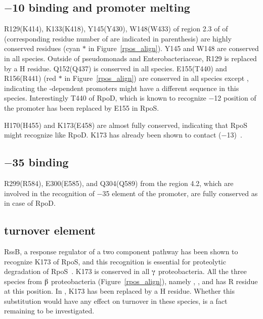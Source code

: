 \subsection{$-$10 binding and promoter melting}

R129(K414), K133(K418), Y145(Y430), W148(W433) of region 2.3 of of
\sigs{} (corresponding residue number of \siga{} are indicated in
parenthesis) are highly con\-served residues (cyan $\ast$ in
Figure~\ref{rpos_align}). Y145 and W148 are conserved in all
species. Outside of pseudomonads and Enterobacteriaceae, R129 is
replaced by a H residue. Q152(Q437) is conserved in all species.
E155(T440) and R156(R441) (red $\ast$ in Figure~\ref{rpos_align})
are conserved in all species except , indicating the
-dependent promoters might have a different sequence in
this species. Interestingly T440 of RpoD, which is known to
recognize $-$12 position of the promoter has been replaced by E155
in RpoS.

H170(H455) and K173(E458) are almost fully conserved, indicating
that RpoS might recognize  like RpoD. K173 has
already been shown to contact ($-$13)~\citep{Becker2001}.

\subsection{$-$35 binding}

R299(R584), E300(E585), and Q304(Q589) from the region 4.2, which
are involved in the recognition of $-$35 element of the promoter,
are fully conserved as in case of RpoD.

\subsection{\sigs{} turnover element}

RssB, a response regulator of a two component pathway has been
shown to recognize K173 of RpoS, and this recognition is essential
for proteolytic degradation of RpoS~\citep[][see also
Section~\ref{chap1_rssb}]{Becker1999}. K173 is conserved in all
$\gammaup$ proteobacteria. All the three species from $\betaup$
proteobacteria (Figure~\ref{rpos_align}), namely , , and  \sigs{} has
R residue at this position. In , K173 has been replaced
by a H residue. Whether this substitution would have any effect on
\sigs{} turnover in these species, is a fact remaining to be
investigated.

